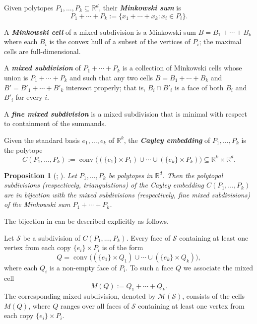 \documentclass[12pt, reqno]{amsart}
\newcommand{\defn}[1]{{\color{blue!50!black}\textbf{\emph{#1}}}}
\theoremstyle{plain}
\newtheorem{proposition}[theorem]{Proposition}
\theoremstyle{definition}
\numberwithin{equation}{section}
\begin{document}
Given polytopes $P_1,\ldots,P_k\subseteq\mathbb{R}^d$, their \defn{Minkowski sum} is
\[
P_1+\cdots+P_k
:=
\{x_1+\cdots+x_k:x_i\in P_i\}.
\]

A \defn{Minkowski cell} of a mixed subdivision is a Minkowski sum $B=B_1+\cdots+B_k$ where each $B_i$ is the convex hull of a subset of the vertices of $P_i$; the maximal cells are full-dimensional.


A \defn{mixed subdivision} of $P_1+\cdots+P_k$ is a collection of Minkowski cells whose union is $P_1+\cdots+P_k$ and such that any two cells $B=B_1+\cdots+B_k$ and $B'=B'_1+\cdots+B'_k$ intersect properly; that is, $B_i\cap B'_i$ is a face of both $B_i$ and $B'_i$ for every $i$.

A \defn{fine mixed subdivision} is a mixed subdivision that is minimal with respect to containment of the summands.

Given the standard basis $e_1,\ldots,e_k$ of $\mathbb{R}^k$, the \defn{Cayley embedding} of $P_1,\ldots,P_k$ is the polytope
\[
C(P_1,\ldots,P_k)
:=
\operatorname{conv}\bigl((\{e_1\}\times P_1)\cup\cdots\cup(\{e_k\}\times P_k)\bigr)
\subseteq
\mathbb{R}^k\times\mathbb{R}^d.
\]


\begin{proposition}[{\cite[Section~5]{Sturmfels1994}; \cite{HuberRambauSantos_CayleyTrick_2000}}]\label{prop: subdivision_are_triangulations}
Let $P_1,\ldots,P_k$ be polytopes in $\mathbb{R}^d$. Then the polytopal subdivisions (respectively, triangulations) of the Cayley embedding $C(P_1,\ldots,P_k)$ are in bijection with the mixed subdivisions (respectively, fine mixed subdivisions) of the Minkowski sum $P_1+\cdots+P_k$.
\end{proposition}

The bijection in  can be described explicitly as follows.

Let $\mathcal{S}$ be a subdivision of $C(P_1,\ldots,P_k)$. Every face of $\mathcal{S}$ containing at least one vertex from each copy $\{e_i\}\times P_i$ is of the form
\[
Q=
\operatorname{conv}\bigl((\{e_1\}\times Q_1)\cup\cdots\cup(\{e_k\}\times Q_k)\bigr),
\]
where each $Q_i$ is a non-empty face of $P_i$. To such a face $Q$ we associate the mixed cell
\[
M(Q):=Q_1+\cdots+Q_k.
\]
The corresponding mixed subdivision, denoted by $\mathcal{M}(\mathcal{S})$, consists of the cells $M(Q)$, where $Q$ ranges over all faces of $\mathcal{S}$ containing at least one vertex from each copy $\{e_i\}\times P_i$.
\end{document}
